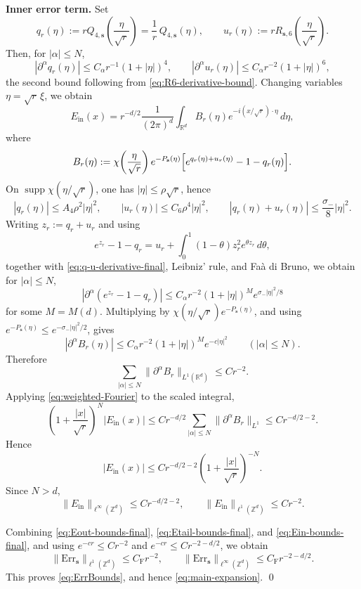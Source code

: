 \documentclass[letterpaper,11pt,reqno]{amsart}
\theoremstyle{definition}
\DeclareMathOperator\supp{supp}
\newcommand{\vs}{\mathbf{s}}\newcommand{\vt}{\mathbf{t}}\newcommand{\vu}{\mathbf{u}}
\begin{document}
\smallskip
\noindent\textbf{Inner error term.}
Set
\[
q_r(\eta):=rQ_{4,\vs}\!\left(\frac{\eta}{\sqrt r}\right)=\frac1r\,Q_{4,\vs}(\eta),
\qquad
u_r(\eta):=rR_{\vs,6}\!\left(\frac{\eta}{\sqrt r}\right).
\]
Then, for \(|\alpha|\le N\),
\begin{equation}\label{eq:q-u-derivative-final}
|\partial^\alpha q_r(\eta)|\le C_\alpha r^{-1}(1+|\eta|)^4,
\qquad
|\partial^\alpha u_r(\eta)|\le C_\alpha r^{-2}(1+|\eta|)^6,
\end{equation}
the second bound following from \eqref{eq:R6-derivative-bound}.
Changing variables \(\eta=\sqrt r\,\xi\), we obtain
\[
E_{\mathrm{in}}(x)
=
r^{-d/2}\frac1{(2\pi)^d}
\int_{\mathbb R^d}
B_r(\eta)e^{-i(x/\sqrt r)\cdot\eta}\,d\eta,
\]
where
\[
B_r(\eta)
:=
\chi\!\left(\frac{\eta}{\sqrt r}\right)e^{-P_{\vs}(\eta)}
\Bigl[e^{q_r(\eta)+u_r(\eta)}-1-q_r(\eta)\Bigr].
\]
On \(\supp \chi(\eta/\sqrt r)\), one has \(|\eta|\le \rho\sqrt r\), hence
\[
|q_r(\eta)|\le A_4\rho^2|\eta|^2,
\qquad
|u_r(\eta)|\le C_6\rho^4|\eta|^2,
\qquad
|q_r(\eta)+u_r(\eta)|\le \frac{\sigma_-}{8}|\eta|^2.
\]
Writing \(z_r:=q_r+u_r\) and using
\[
e^{z_r}-1-q_r
=
u_r+\int_0^1(1-\theta)z_r^2e^{\theta z_r}\,d\theta,
\]
together with \eqref{eq:q-u-derivative-final}, Leibniz' rule, and Fa\`a di Bruno,
we obtain for \(|\alpha|\le N\),
\[
|\partial^\alpha(e^{z_r}-1-q_r)|
\le
C_\alpha r^{-2}(1+|\eta|)^M e^{\sigma_-|\eta|^2/8}
\]
for some \(M=M(d)\). Multiplying by \(\chi(\eta/\sqrt r)e^{-P_{\vs}(\eta)}\), and using
\(e^{-P_{\vs}(\eta)}\le e^{-\sigma_-|\eta|^2/2}\), gives
\begin{equation*}
|\partial^\alpha B_r(\eta)|
\le
C_\alpha r^{-2}(1+|\eta|)^M e^{-c|\eta|^2}
\qquad (|\alpha|\le N).
\end{equation*}
Therefore
\[
\sum_{|\alpha|\le N}\|\partial^\alpha B_r\|_{L^1(\mathbb R^d)}\le Cr^{-2}.
\]
Applying \eqref{eq:weighted-Fourier} to the scaled integral,
\[
\left(1+\frac{|x|}{\sqrt r}\right)^N |E_{\mathrm{in}}(x)|
\le
Cr^{-d/2}\sum_{|\alpha|\le N}\|\partial^\alpha B_r\|_{L^1}
\le
Cr^{-d/2-2}.
\]
Hence
\[
|E_{\mathrm{in}}(x)|
\le
Cr^{-d/2-2}\left(1+\frac{|x|}{\sqrt r}\right)^{-N}.
\]
Since \(N>d\),
\begin{equation}\label{eq:Ein-bounds-final}
\|E_{\mathrm{in}}\|_{\ell^\infty(\mathbb Z^d)}\le Cr^{-d/2-2},
\qquad
\|E_{\mathrm{in}}\|_{\ell^1(\mathbb Z^d)}\le Cr^{-2}.
\end{equation}


\smallskip
Combining \eqref{eq:Eout-bounds-final}, \eqref{eq:Etail-bounds-final},
and \eqref{eq:Ein-bounds-final}, and using \(e^{-cr}\le Cr^{-2}\) and
\(e^{-cr}\le Cr^{-2-d/2}\), we obtain
\[
\|\mathrm{Err}_{\vs}\|_{\ell^1(\mathbb Z^d)}\le C_{\mathrm F}r^{-2},
\qquad
\|\mathrm{Err}_{\vs}\|_{\ell^\infty(\mathbb Z^d)}\le C_{\mathrm F}r^{-2-d/2}.
\]
This proves \eqref{eq:ErrBounds}, and hence \eqref{eq:main-expansion}.
\qed
\end{document}
